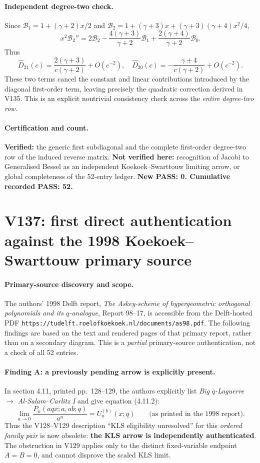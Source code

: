 \documentclass[11pt]{article}
\begin{document}
\paragraph{Independent degree-two check.}
Since
$\mathcal B_1=1+(\gamma+2)x/2$ and
$\mathcal B_2=1+(\gamma+3)x+(\gamma+3)(\gamma+4)x^2/4$,
\[
 x^2\mathcal B_2''
 =2\mathcal B_2
 -\frac{4(\gamma+3)}{\gamma+2}\mathcal B_1
 +\frac{2(\gamma+4)}{\gamma+2}\mathcal B_0.
\]
Thus
\[
 \widehat D_{21}(c)=\frac{2(\gamma+3)}{c(\gamma+2)}+O(c^{-2}),
 \quad
 \widehat D_{20}(c)=-\frac{\gamma+4}{c(\gamma+2)}+O(c^{-2}).
\]
These two terms cancel the constant and linear contributions introduced
by the diagonal first-order term, leaving precisely the quadratic
correction derived in V135. This is an explicit nontrivial consistency
check across the \emph{entire degree-two row}.

\paragraph{Certification and count.}
\textbf{Verified:} the generic first subdiagonal and the complete
first-order degree-two row of the induced reverse matrix.
\textbf{Not verified here:} recognition of Jacobi to Generalised Bessel
as an independent Koekoek--Swarttouw limiting arrow, or global
completeness of the 52-entry ledger.
\textbf{New PASS: 0. Cumulative recorded PASS: 52.}


\clearpage
\section{V137: first direct authentication against the 1998 Koekoek--Swarttouw primary source}
\label{sec:v137-primary-kls}
\paragraph{Primary-source discovery and scope.}
The authors' 1998 Delft report, \emph{The Askey-scheme of hypergeometric orthogonal polynomials and its $q$-analogue}, Report 98--17, is accessible from the Delft-hosted PDF
\texttt{https://tudelft.roelofkoekoek.nl/documents/as98.pdf}.
The following findings are based on the text and rendered pages of that primary report, rather than on a secondary diagram.  This is a \emph{partial} primary-source authentication, not a check of all 52 entries.

\paragraph{Finding A: a previously pending arrow is explicitly present.}
In section 4.11, printed pp.~128--129, the authors explicitly list
\emph{Big $q$-Laguerre $\longrightarrow$ Al-Salam--Carlitz I} and give equation (4.11.2):
\[
 \lim_{a\to0}\frac{P_n(aqx;a,ab;q)}{a^n}=U_n^{(b)}(x;q)
 \qquad\text{(as printed in the 1998 report).}
\]
Thus the V128--V129 description ``KLS eligibility unresolved'' for this \emph{ordered family pair} is now obsolete: \textbf{the KLS arrow is independently authenticated}.  The obstruction in V129 applies only to the distinct fixed-variable endpoint $A=B=0$, and cannot disprove the scaled KLS limit.
\end{document}
